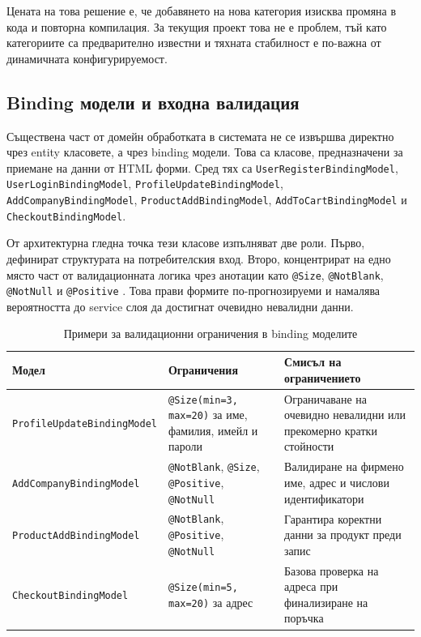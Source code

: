 Цената на това решение е, че добавянето на нова категория изисква промяна в кода и повторна компилация. За текущия проект това не е проблем, тъй като категориите са предварително известни и тяхната стабилност е по-важна от динамичната конфигурируемост.

\subsection{Binding модели и входна валидация}

Съществена част от домейн обработката в системата не се извършва директно чрез entity класовете, а чрез binding модели. Това са класове, предназначени за приемане на данни от HTML форми. Сред тях са \texttt{UserRegisterBindingModel}, \texttt{UserLoginBindingModel}, \texttt{ProfileUpdateBindingModel}, \texttt{AddCompanyBindingModel}, \texttt{ProductAddBindingModel}, \texttt{AddToCartBindingModel} и \texttt{CheckoutBindingModel}.

От архитектурна гледна точка тези класове изпълняват две роли. Първо, дефинират структурата на потребителския вход. Второ, концентрират на едно място част от валидационната логика чрез анотации като \texttt{@Size}, \texttt{@NotBlank}, \texttt{@NotNull} и \texttt{@Positive} \cite{hibernatevalidator}. Това прави формите по-прогнозируеми и намалява вероятността до service слоя да достигнат очевидно невалидни данни.

\begin{table}[H]
    \centering
    \caption{Примери за валидационни ограничения в binding моделите}
    \label{tab:binding-validation}
    \begin{tabularx}{\textwidth}{L{4.1cm}L{4cm}Y}
        \toprule
        Модел & Ограничения & Смисъл на ограничението \\
        \midrule
        \texttt{ProfileUpdateBindingModel} & \texttt{@Size(min=3, max=20)} за име, фамилия, имейл и пароли & Ограничаване на очевидно невалидни или прекомерно кратки стойности \\
        \texttt{AddCompanyBindingModel} & \texttt{@NotBlank}, \texttt{@Size}, \texttt{@Positive}, \texttt{@NotNull} & Валидиране на фирмено име, адрес и числови идентификатори \\
        \texttt{ProductAddBindingModel} & \texttt{@NotBlank}, \texttt{@Positive}, \texttt{@NotNull} & Гарантира коректни данни за продукт преди запис \\
        \texttt{CheckoutBindingModel} & \texttt{@Size(min=5, max=20)} за адрес & Базова проверка на адреса при финализиране на поръчка \\
        \bottomrule
    \end{tabularx}
\end{table}

